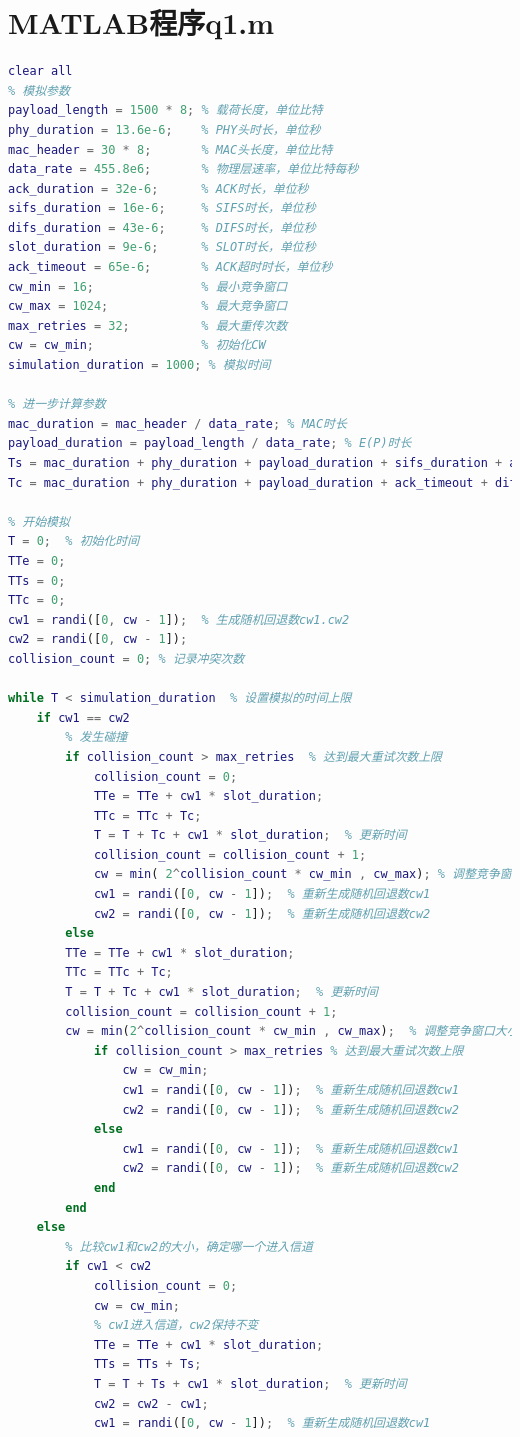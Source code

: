\documentclass[bwprint]{gmcmthesis}
\begin{document}
\section{MATLAB程序q1.m}
\begin{lstlisting}[language=MATLAB]%设置不同语言即可。
clear all
% 模拟参数
payload_length = 1500 * 8; % 载荷长度，单位比特
phy_duration = 13.6e-6;    % PHY头时长，单位秒
mac_header = 30 * 8;       % MAC头长度，单位比特
data_rate = 455.8e6;       % 物理层速率，单位比特每秒
ack_duration = 32e-6;      % ACK时长，单位秒
sifs_duration = 16e-6;     % SIFS时长，单位秒
difs_duration = 43e-6;     % DIFS时长，单位秒
slot_duration = 9e-6;      % SLOT时长，单位秒
ack_timeout = 65e-6;       % ACK超时时长，单位秒
cw_min = 16;               % 最小竞争窗口
cw_max = 1024;             % 最大竞争窗口
max_retries = 32;          % 最大重传次数
cw = cw_min;               % 初始化CW
simulation_duration = 1000; % 模拟时间

% 进一步计算参数
mac_duration = mac_header / data_rate; % MAC时长
payload_duration = payload_length / data_rate; % E(P)时长
Ts = mac_duration + phy_duration + payload_duration + sifs_duration + ack_duration + difs_duration; % Ts时长
Tc = mac_duration + phy_duration + payload_duration + ack_timeout + difs_duration; % Tc时长

% 开始模拟
T = 0;  % 初始化时间
TTe = 0;
TTs = 0;
TTc = 0;
cw1 = randi([0, cw - 1]);  % 生成随机回退数cw1.cw2
cw2 = randi([0, cw - 1]);  
collision_count = 0; % 记录冲突次数

while T < simulation_duration  % 设置模拟的时间上限
    if cw1 == cw2
        % 发生碰撞
        if collision_count > max_retries  % 达到最大重试次数上限   
            collision_count = 0;  
            TTe = TTe + cw1 * slot_duration; 
            TTc = TTc + Tc; 
            T = T + Tc + cw1 * slot_duration;  % 更新时间
            collision_count = collision_count + 1;
            cw = min( 2^collision_count * cw_min , cw_max); % 调整竞争窗口大小，不超过cw_max
            cw1 = randi([0, cw - 1]);  % 重新生成随机回退数cw1
            cw2 = randi([0, cw - 1]);  % 重新生成随机回退数cw2
        else
        TTe = TTe + cw1 * slot_duration; 
        TTc = TTc + Tc; 
        T = T + Tc + cw1 * slot_duration;  % 更新时间
        collision_count = collision_count + 1; 
        cw = min(2^collision_count * cw_min , cw_max);  % 调整竞争窗口大小，不超过cw_max
            if collision_count > max_retries % 达到最大重试次数上限              
                cw = cw_min;
                cw1 = randi([0, cw - 1]);  % 重新生成随机回退数cw1
                cw2 = randi([0, cw - 1]);  % 重新生成随机回退数cw2
            else
                cw1 = randi([0, cw - 1]);  % 重新生成随机回退数cw1
                cw2 = randi([0, cw - 1]);  % 重新生成随机回退数cw2
            end    
        end
    else
        % 比较cw1和cw2的大小，确定哪一个进入信道
        if cw1 < cw2
            collision_count = 0;
            cw = cw_min;
            % cw1进入信道，cw2保持不变
            TTe = TTe + cw1 * slot_duration;
            TTs = TTs + Ts;
            T = T + Ts + cw1 * slot_duration;  % 更新时间
            cw2 = cw2 - cw1;
            cw1 = randi([0, cw - 1]);  % 重新生成随机回退数cw1
            

\end{lstlisting}
\end{document}
